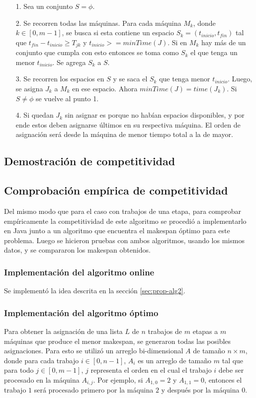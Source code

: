 \documentclass[12pt,letterpaper]{article}
\begin{document}
\begin{itemize}
\item[1.] Sea un conjunto $S = \phi$.
\item[2.] Se recorren todas las máquinas. Para cada máquina $M_{k}$, donde $k \in [0, m-1]$, se busca si esta contiene un espacio $S_{k} = (t_{inicio}, t_{fin})$ tal que $t_{fin} - t_{inicio} \geq T_{jk}$ y $t_{inicio} >= minTime(J)$. Si en $M_{k}$ hay más de un conjunto que cumpla con esto entonces se toma como $S_{k}$ el que tenga un menor $t_{inicio}$. Se agrega $S_{k}$ a $S$.
\item[3.] Se recorren los espacios en $S$ y se saca el $S_{k}$ que tenga menor $t_{inicio}$. Luego, se asigna $J_{k}$ a $M_{k}$ en ese espacio. Ahora $minTime(J) = time(J_{k})$. Si $S \not = \phi$ se vuelve al punto 1.
\item[4.] Si quedan $J_{k}$ sin asignar es porque no habían espacios disponibles, y por ende estos deben asignarse últimos en su respectiva máquina. El orden de asignación será desde la máquina de menor tiempo total a la de mayor.
\end{itemize}
	
\subsection{Demostración de competitividad}


\subsection{Comprobación empírica de competitividad}
Del mismo modo que para el caso con trabajos de una etapa, para comprobar empíricamente la competitividad de este algoritmo se procedió a implementarlo en Java junto a un algoritmo que encuentra el makespan óptimo para este problema. Luego se hicieron pruebas con ambos algoritmos, usando los mismos datos, y se compararon los makespan obtenidos.

\subsubsection{Implementación del algoritmo online}
Se implementó la idea descrita en la sección \ref{sec:prop-alg2}.

\subsubsection{Implementación del algoritmo óptimo}
Para obtener la asignación de una lista $L$ de $n$ trabajos de $m$ etapas a $m$ máquinas que produce el menor makespan, se generaron todas las posibles asignaciones. Para esto se utilizó un arreglo bi-dimensional $A$ de tamaño $n \times m$, donde para cada trabajo $i \in [0, n-1]$, $A_{i}$ es un arreglo de tamaño $m$ tal que para todo $j \in [0, m-1]$, $j$ representa el orden en el cual el trabajo $i$ debe ser procesado en la máquina $A_{i,j}$. Por ejemplo, si $A_{1,0} = 2$ y $A_{1,1} = 0$, entonces el trabajo $1$ será procesado primero por la máquina $2$ y después por la máquina $0$. \\
\end{document}
